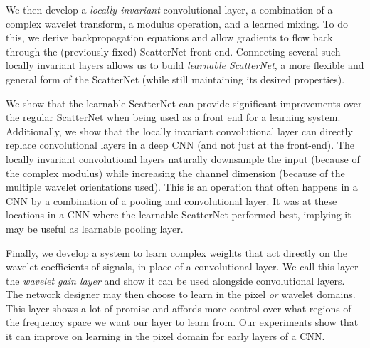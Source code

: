   We then develop a \emph{locally invariant} convolutional layer, a combination of a complex wavelet
  transform, a modulus operation, and a learned mixing. To do this, we derive
  backpropagation equations and allow gradients to flow back through the
  (previously fixed) ScatterNet front end. Connecting several such
  locally invariant layers allows us to build \emph{learnable ScatterNet}, a more flexible and general
  form of the ScatterNet (while still maintaining its desired properties).

  We show that the learnable ScatterNet can provide significant improvements
  over the regular ScatterNet when being used as a front end for a learning
  system. Additionally, we show that the locally invariant convolutional
  layer can directly replace convolutional layers in a deep CNN (and not just at the front-end).
  The locally invariant convolutional layers naturally downsample the input
  (because of the complex modulus) while increasing the channel dimension (because of the multiple
  wavelet orientations used). This is an operation that often happens in a CNN
  by a combination of a pooling and convolutional layer. It was at these
  locations in a CNN where the learnable ScatterNet performed best, implying it
  may be useful as learnable pooling layer.

  Finally, we develop a system to learn complex weights that act directly on the
  wavelet coefficients of signals, in place of a convolutional layer. We call
  this layer the \emph{wavelet gain layer} and show it can be used alongside convolutional
  layers. The network designer may then choose to learn in the pixel \emph{or}
  wavelet domains. This layer shows a lot of promise and affords more control over what
  regions of the frequency space we want our layer to learn from. Our
  experiments show that it can improve on learning in the pixel domain for early
  layers of a CNN.

